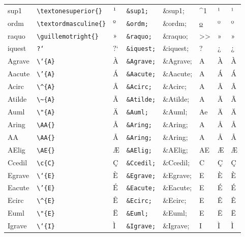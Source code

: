\documentclass[11pt]{article}
\begin{document}
\begin{longtable}{llllllll}
sup1 & \texttt{\textbackslash{}textonesuperior\{\}} & $\mbox{\textonesuperior{}}$ & \texttt{\&sup1;} & \&sup1; & \^{}1 & ¹ & ¹\\
ordm & \texttt{\textbackslash{}textordmasculine\{\}} & $\mbox{\textordmasculine{}}$ & \texttt{\&ordm;} & \&ordm; & \uline{o} & º & º\\
raquo & \texttt{\textbackslash{}guillemotright\{\}} & $\mbox{\guillemotright{}}$ & \texttt{\&raquo;} & \&raquo; & >> & » & »\\
iquest & \texttt{?`} & $\mbox{?`}$ & \texttt{\&iquest;} & \&iquest; & ? & ¿ & ¿\\
Agrave & \texttt{\textbackslash{}`\{A\}} & $\mbox{\`{A}}$ & \texttt{\&Agrave;} & \&Agrave; & A & À & À\\
Aacute & \texttt{\textbackslash{}'\{A\}} & $\mbox{\'{A}}$ & \texttt{\&Aacute;} & \&Aacute; & A & Á & Á\\
Acirc & \texttt{\textbackslash{}\textasciicircum{}\{A\}} & $\mbox{\^{A}}$ & \texttt{\&Acirc;} & \&Acirc; & A & Â & Â\\
Atilde & \texttt{\textbackslash{}\textasciitilde{}\{A\}} & $\mbox{\~{A}}$ & \texttt{\&Atilde;} & \&Atilde; & A & Ã & Ã\\
Auml & \texttt{\textbackslash{}"\{A\}} & $\mbox{\"{A}}$ & \texttt{\&Auml;} & \&Auml; & Ae & Ä & Ä\\
Aring & \texttt{\textbackslash{}AA\{\}} & $\mbox{\AA{}}$ & \texttt{\&Aring;} & \&Aring; & A & Å & Å\\
AA & \texttt{\textbackslash{}AA\{\}} & $\mbox{\AA{}}$ & \texttt{\&Aring;} & \&Aring; & A & Å & Å\\
AElig & \texttt{\textbackslash{}AE\{\}} & $\mbox{\AE{}}$ & \texttt{\&AElig;} & \&AElig; & AE & Æ & Æ\\
Ccedil & \texttt{\textbackslash{}c\{C\}} & $\mbox{\c{C}}$ & \texttt{\&Ccedil;} & \&Ccedil; & C & Ç & Ç\\
Egrave & \texttt{\textbackslash{}`\{E\}} & $\mbox{\`{E}}$ & \texttt{\&Egrave;} & \&Egrave; & E & È & È\\
Eacute & \texttt{\textbackslash{}'\{E\}} & $\mbox{\'{E}}$ & \texttt{\&Eacute;} & \&Eacute; & E & É & É\\
Ecirc & \texttt{\textbackslash{}\textasciicircum{}\{E\}} & $\mbox{\^{E}}$ & \texttt{\&Ecirc;} & \&Ecirc; & E & Ê & Ê\\
Euml & \texttt{\textbackslash{}"\{E\}} & $\mbox{\"{E}}$ & \texttt{\&Euml;} & \&Euml; & E & Ë & Ë\\
Igrave & \texttt{\textbackslash{}`\{I\}} & $\mbox{\`{I}}$ & \texttt{\&Igrave;} & \&Igrave; & I & Ì & Ì\\

\end{longtable}
\end{document}
